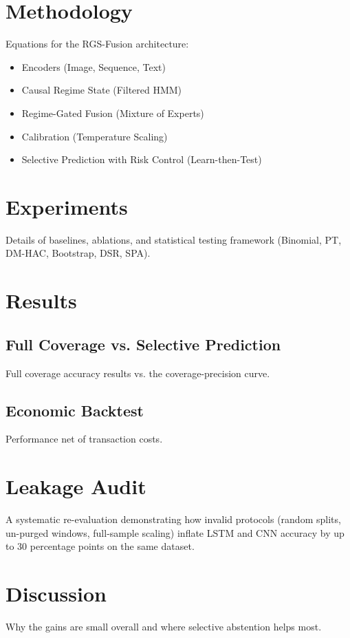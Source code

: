\documentclass[5p,times]{elsarticle}
\begin{document}
\section{Methodology}
Equations for the RGS-Fusion architecture:
\begin{itemize}
    \item Encoders (Image, Sequence, Text)
    \item Causal Regime State (Filtered HMM)
    \item Regime-Gated Fusion (Mixture of Experts)
    \item Calibration (Temperature Scaling)
    \item Selective Prediction with Risk Control (Learn-then-Test)
\end{itemize}

\section{Experiments}
Details of baselines, ablations, and statistical testing framework (Binomial, PT, DM-HAC, Bootstrap, DSR, SPA).

\section{Results}
\subsection{Full Coverage vs. Selective Prediction}
Full coverage accuracy results vs. the coverage-precision curve.

\subsection{Economic Backtest}
Performance net of transaction costs.

\section{Leakage Audit}
A systematic re-evaluation demonstrating how invalid protocols (random splits, un-purged windows, full-sample scaling) inflate LSTM and CNN accuracy by up to 30 percentage points on the same dataset.

\section{Discussion}
Why the gains are small overall and where selective abstention helps most.
\end{document}
